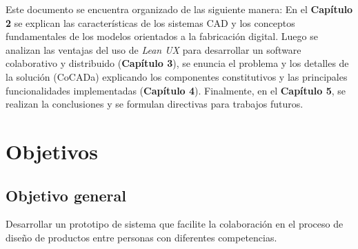 \vspace{0mm}

Este documento se encuentra organizado de las siguiente manera: 
En el \textbf{Capítulo 2} se explican las características de los sistemas CAD y los conceptos fundamentales de los  modelos orientados a la fabricación digital. Luego se analizan las ventajas del uso de \textit{\Gls{Lean UX}} \citep{Gothelf2013} para desarrollar un software colaborativo y distribuido (\textbf{Capítulo 3}), se enuncia el problema y los detalles de la solución (CoCADa) explicando los componentes constitutivos y las principales funcionalidades implementadas (\textbf{Capítulo 4}). Finalmente, en el \textbf{Capítulo 5}, se realizan la conclusiones y se formulan directivas para trabajos futuros.










\section{Objetivos}

\subsection{Objetivo general}

Desarrollar un prototipo de sistema que facilite la colaboración en el proceso de diseño de productos entre personas con diferentes competencias.



